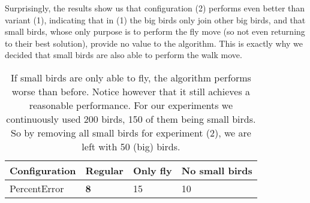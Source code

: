 Surprisingly, the results show us that configuration (2) performs even better
than variant (1), indicating that in (1) the big birds only
join other big birds, and that small birds, whose only purpose is to perform 
the fly move (so not even returning to their best solution), provide no value to the algorithm.
This is exactly why we decided that small birds are also able to perform the walk move.

\begin{table}[h!]
\centering
\begin{tabular}{ |p{1.5cm}||p{1.2cm}|p{1.2cm}|p{2cm}| }
 \hline
 Configuration& \textbf{Regular} & Only fly& No small birds\\
 \hline \hline
PercentError & \textbf{8} & 15 & 10\\
\hline
\end{tabular}
\caption{If small birds are only able to fly, the algorithm performs worse than before.
Notice however that it still achieves a reasonable performance.
For our experiments we continuously used 200 birds, 150 of them being small birds.
So by removing all small birds for experiment (2), we are left with 50 (big) birds.}
\label{small_birds_only_fly}
\end{table}
